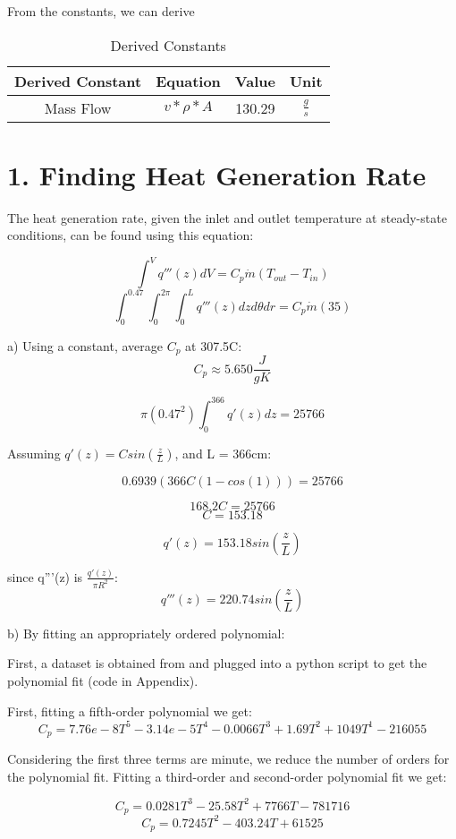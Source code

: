 \documentclass[12pt,letterpaper]{article}
\begin{document}
From the constants, we can derive
\begin{table}[h]
     \centering
    \begin{tabular}{cccc}
    \hline
       Derived Constant & Equation & Value & Unit \\
    \hline
       Mass Flow & $ v * \rho * A $ & 130.29 & $\frac{g}{s}$ \\
    \hline
    \end{tabular}
    \caption {Derived Constants}
    \label{tab:der_constants}
\end{table}



\section* {1. Finding Heat Generation Rate}

The heat generation rate, given the inlet and outlet temperature
at steady-state conditions, can be found using this equation:

\[\int^{V} q'''(z) dV = C_p \dot{m} (T_{out} - T_{in})\]
\[\int^{0.47}_{0} \int^{2\pi}_{0} \int^{L}_{0} q'''(z) dz d\theta dr= C_p \dot{m} (35)\]

a) Using a constant, average $C_p$ at 307.5C:
\[C_p \approx 5.650 \frac{J}{g K}\]

\[ \pi (0.47^2)  \int^{366}_{0} q'(z) dz = 25766\]

Assuming $q'(z) = C sin(\frac{z}{L})$,
and L = 366cm:

\[ 0.6939 (366C(1-cos(1))) = 25766\]

\[168.2C = 25766\]
\[C = 153.18 \]

\[q'(z) = 153.18 sin(\frac{z}{L})\]

since q'''(z) is $\frac{q'(z)}{\pi R^2}$:
\[q'''(z) = 220.74 sin(\frac{z}{L})\]

b) By fitting an appropriately ordered polynomial:

First, a dataset is obtained from \cite{moran_fundamentals_2010}
and plugged into a python script to get the polynomial fit
(code in Appendix).

First, fitting a fifth-order polynomial we get:
\[C_p = 7.76e-8 T^5 -3.14e-5 T^4 -0.0066 T^3 +1.69 T^2 +1049T^1 -216055\]

Considering the first three terms are minute, we reduce the 
number of orders for the polynomial fit. Fitting a third-order and 
second-order polynomial fit we get:

\[C_p = 0.0281T^3 - 25.58T^2 + 7766 T - 781716 \]
\[C_p = 0.7245T^2 - 403.24 T + 61525 \]
\end{document}
